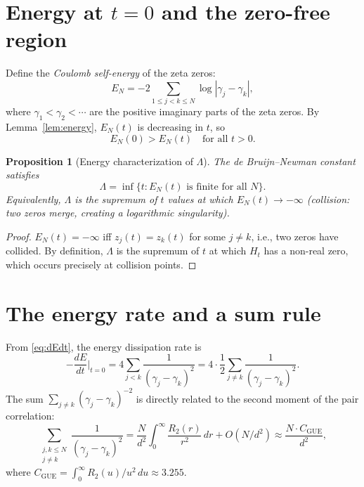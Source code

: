 \documentclass[11pt,a4paper]{article}
\newtheorem{proposition}{Proposition}
\begin{document}
\section{Energy at $t = 0$ and the zero-free region}

Define the \emph{Coulomb self-energy} of the zeta zeros:
\[
  E_N = -2\sum_{1 \leq j < k \leq N} \log|\gamma_j - \gamma_k|,
\]
where $\gamma_1 < \gamma_2 < \cdots$ are the positive imaginary
parts of the zeta zeros. By Lemma~\ref{lem:energy}, $E_N(t)$
is decreasing in $t$, so
\begin{equation}\label{eq:E-bound}
  E_N(0) > E_N(t) \quad \text{for all } t > 0.
\end{equation}

\begin{proposition}[Energy characterization of $\Lambda$]
\label{prop:energy-lambda}
  The de Bruijn--Newman constant satisfies
  \[
    \Lambda = \inf\{t : E_N(t) \text{ is finite for all } N\}.
  \]
  Equivalently, $\Lambda$ is the supremum of $t$ values at which
  $E_N(t) \to -\infty$ (collision: two zeros merge, creating a
  logarithmic singularity).
\end{proposition}

\begin{proof}
  $E_N(t) = -\infty$ iff $z_j(t) = z_k(t)$ for some $j \neq k$,
  i.e., two zeros have collided. By definition, $\Lambda$ is the
  supremum of $t$ at which $H_t$ has a non-real zero, which occurs
  precisely at collision points.
\end{proof}

\section{The energy rate and a sum rule}

From \eqref{eq:dEdt}, the energy dissipation rate is
\[
  -\frac{dE}{dt}\bigg|_{t=0}
  = 4\sum_{j<k} \frac{1}{(\gamma_j - \gamma_k)^2}
  = 4 \cdot \frac{1}{2}\sum_{j \neq k}\frac{1}{(\gamma_j-\gamma_k)^2}.
\]
The sum $\sum_{j \neq k} (\gamma_j - \gamma_k)^{-2}$ is directly
related to the second moment of the pair correlation:
\begin{equation}\label{eq:sum-rule}
  \sum_{\substack{j,k \leq N \\ j \neq k}}
  \frac{1}{(\gamma_j - \gamma_k)^2}
  = \frac{N}{d^2}\int_0^\infty \frac{R_2(r)}{r^2}\,dr + O(N/d^2)
  \approx \frac{N \cdot C_{\mathrm{GUE}}}{d^2},
\end{equation}
where $C_{\mathrm{GUE}} = \int_0^\infty R_2(u)/u^2\,du \approx 3.255$.
\end{document}
